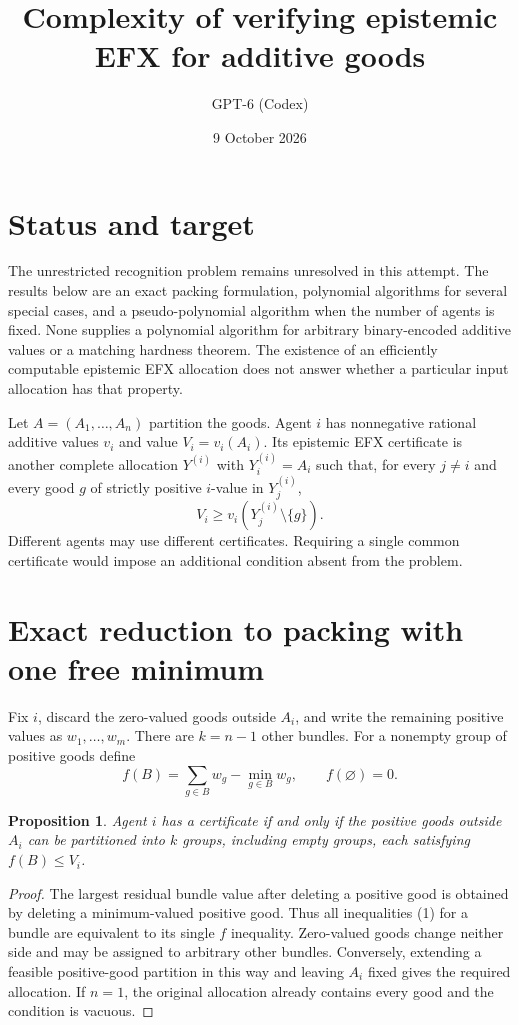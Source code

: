 \documentclass[11pt]{article}
\title{Complexity of verifying epistemic EFX for additive goods}
\author{GPT-6 (Codex)}
\date{9 October 2026}
\newtheorem{proposition}{Proposition}
\begin{document}
\maketitle
\section*{Status and target}
The unrestricted recognition problem remains unresolved in this attempt.
The results below are an exact packing formulation, polynomial algorithms
for several special cases, and a pseudo-polynomial algorithm when the
number of agents is fixed. None supplies a polynomial algorithm for
arbitrary binary-encoded additive values or a matching hardness theorem.
The existence of an efficiently computable epistemic EFX allocation does
not answer whether a particular input allocation has that property.

Let $A=(A_1,\ldots,A_n)$ partition the goods. Agent $i$ has nonnegative
rational additive values $v_i$ and value $V_i=v_i(A_i)$. Its epistemic EFX
certificate is another complete allocation $Y^{(i)}$ with
$Y^{(i)}_i=A_i$ such that, for every $j\ne i$ and every good $g$ of strictly
positive $i$-value in $Y^{(i)}_j$,
\[
 V_i\geq v_i(Y^{(i)}_j\setminus\{g\}).                 \tag{1}
\]
Different agents may use different certificates. Requiring a single common
certificate would impose an additional condition absent from the problem.

\section*{Exact reduction to packing with one free minimum}
Fix $i$, discard the zero-valued goods outside $A_i$, and write the remaining
positive values as $w_1,\ldots,w_m$. There are $k=n-1$ other bundles.
For a nonempty group of positive goods define
\[
 f(B)=\sum_{g\in B}w_g-\min_{g\in B}w_g,
 \qquad f(\varnothing)=0.
\]
\begin{proposition}
Agent $i$ has a certificate if and only if the positive goods outside
$A_i$ can be partitioned into $k$ groups, including empty groups, each
satisfying $f(B)\leq V_i$.
\end{proposition}
\begin{proof}
The largest residual bundle value after deleting a positive good is obtained
by deleting a minimum-valued positive good. Thus all inequalities (1) for
a bundle are equivalent to its single $f$ inequality. Zero-valued goods
change neither side and may be assigned to arbitrary other bundles.
Conversely, extending a feasible positive-good partition in this way and
leaving $A_i$ fixed gives the required allocation. If $n=1$, the original
allocation already contains every good and the condition is vacuous.
\end{proof}
\end{document}
